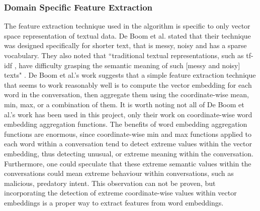 \documentclass[11pt]{article}
\begin{document}
\subsubsection{Domain Specific Feature Extraction}
The feature extraction technique used in the algorithm is specific to only vector space representation of textual data. De Boom et al. stated that their technique was designed specifically for shorter text, that is messy, noisy and has a sparse vocabulary. They also noted that ``traditional textual representations, such as tf-idf \cite{sparck1972statistical}, have difficulty grasping the semantic meaning of such [messy and noisy] texts" \cite{de2016representation}. De Boom et al.'s work suggests that a simple feature extraction technique that seems to work reasonably well is to compute the vector embedding for each word in the conversation, then aggregate them using the coordinate-wise mean, min, max, or a combination of them. It is worth noting not all of De Boom et al.'s work has been used in this project, only their work on coordinate-wise word embedding aggregation functions. The benefits of word embedding aggregation functions are enormous, since coordinate-wise min and max functions applied to each word within a conversation tend to detect extreme values within the vector embedding, thus detecting unusual, or extreme meaning within the conversation. Furthermore, one could speculate that these extreme semantic values within the conversations could mean extreme behaviour within conversations, such as malicious, predatory intent. This observation can not be proven, but incorporating the detection of extreme coordinate-wise values within vector embeddings is a proper way to extract features from word embeddings.
\end{document}
